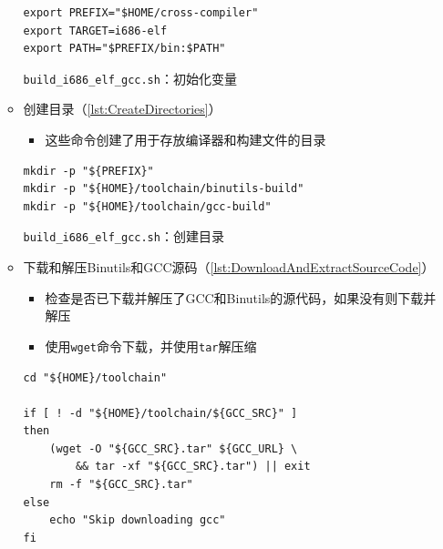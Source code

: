 \begin{enumerate}
\begin{itemize}
\begin{listing}[htbp]
\begin{verbatim}
export PREFIX="$HOME/cross-compiler"
export TARGET=i686-elf
export PATH="$PREFIX/bin:$PATH"
                    \end{verbatim}
                        \caption{\texttt{build\_i686\_elf\_gcc.sh}：初始化变量}\label{lst:InitializeVariables}
                    \end{listing}
              \item 创建目录（\cref{lst:CreateDirectories}）
                    \begin{itemize}
                        \item 这些命令创建了用于存放编译器和构建文件的目录
                    \end{itemize}
                    \begin{listing}[htbp]
                        \begin{verbatim}
mkdir -p "${PREFIX}"
mkdir -p "${HOME}/toolchain/binutils-build"
mkdir -p "${HOME}/toolchain/gcc-build"
                    \end{verbatim}
                        \caption{\texttt{build\_i686\_elf\_gcc.sh}：创建目录}\label{lst:CreateDirectories}
                    \end{listing}
              \item 下载和解压Binutils和GCC源码（\cref{lst:DownloadAndExtractSourceCode}）
                    \begin{itemize}
                        \item 检查是否已下载并解压了GCC和Binutils的源代码，如果没有则下载并解压
                        \item 使用\texttt{wget}命令下载，并使用\texttt{tar}解压缩
                    \end{itemize}
                    \begin{listing}[htbp]
                        \begin{verbatim}
cd "${HOME}/toolchain"

if [ ! -d "${HOME}/toolchain/${GCC_SRC}" ]
then
    (wget -O "${GCC_SRC}.tar" ${GCC_URL} \
        && tar -xf "${GCC_SRC}.tar") || exit
    rm -f "${GCC_SRC}.tar"
else
    echo "Skip downloading gcc"
fi


\end{verbatim}
\end{listing}
\end{itemize}
\end{enumerate}
